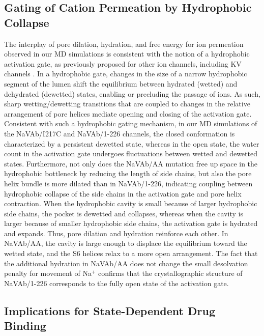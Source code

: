 \begin{refsection}
{\subsection{Gating of Cation Permeation by Hydrophobic Collapse}

The interplay of pore dilation, hydration, and free energy for ion permeation observed in our MD simulations is consistent with the notion of a hydrophobic activation gate, as previously proposed for other ion channels, including KV channels \cite{Jensen:2010fd,Aryal:2015ge,Zhu:2012ch,Neale:2015ee}. In a hydrophobic gate, changes in the size of a narrow hydrophobic segment of the lumen shift the equilibrium between hydrated (wetted) and dehydrated (dewetted) states, enabling or precluding the passage of ions. As such, sharp wetting/dewetting transitions that are coupled to changes in the relative arrangement of pore helices mediate opening and closing of the activation gate. Consistent with such a hydrophobic gating mechanism, in our MD simulations of the NaVAb/I217C and NaVAb/1-226 channels, the closed conformation is characterized by a persistent dewetted state, whereas in the open state, the water count in the activation gate undergoes fluctuations between wetted and dewetted states. Furthermore, not only does the NaVAb/AA mutation free up space in the hydrophobic bottleneck by reducing the length of side chains, but also the pore helix bundle is more dilated than in NaVAb/1-226, indicating coupling between hydrophobic collapse of the side chains in the activation gate and pore helix contraction. When the hydrophobic cavity is small because of larger hydrophobic side chains, the pocket is dewetted and collapses, whereas when the cavity is larger because of smaller hydrophobic side chains, the activation gate is hydrated and expands. Thus, pore dilation and hydration reinforce each other. In NaVAb/AA, the cavity is large enough to displace the equilibrium toward the wetted state, and the S6 helices relax to a more open arrangement. The fact that the additional hydration in NaVAb/AA does not change the small desolvation penalty for movement of Na$^+$ confirms that the crystallographic structure of NaVAb/1-226 corresponds to the fully open state of the activation gate.

\subsection{Implications for State-Dependent Drug Binding} 

}
\end{refsection}
